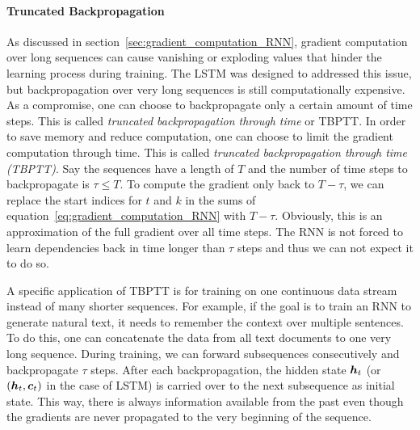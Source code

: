 		\paragraph{Truncated Backpropagation}
		As discussed in section~\ref{sec:gradient_computation_RNN}, gradient computation over long sequences can cause vanishing or exploding values that hinder the learning process during training.
		The LSTM was designed to addressed this issue, but backpropagation over very long sequences is still computationally expensive.
		As a compromise, one can choose to backpropagate only a certain amount of time steps.
		This is called \emph{truncated backpropagation through time} or TBPTT.
		In order to save memory and reduce computation, one can choose to limit the gradient computation through time.
		This is called \emph{truncated backpropagation through time (TBPTT)}. 
		Say the sequences have a length of $T$ and the number of time steps to backpropagate is $\tau \leq T$.
		To compute the gradient only back to $T - \tau$, we can replace the start indices for $t$ and $k$ in the sums of equation~\ref{eq:gradient_computation_RNN} with $T - \tau$.
		Obviously, this is an approximation of the full gradient over all time steps.
		The RNN is not forced to learn dependencies back in time longer than $\tau$ steps and thus we can not expect it to do so.
		
		A specific application of TBPTT is for training on one continuous data stream instead of many shorter sequences.
		For example, if the goal is to train an RNN to generate natural text, it needs to remember the context over multiple sentences.
		To do this, one can concatenate the data from all text documents to one very long sequence.
		During training, we can forward subsequences consecutively and backpropagate $\tau$ steps.
		After each backpropagation, the hidden state $\bm{h}_t$ (or $(\bm{h}_t, \bm{c}_t)$ in the case of LSTM) is carried over to the next subsequence as initial state.
		This way, there is always information available from the past even though the gradients are never propagated to the very beginning of the sequence.
		
